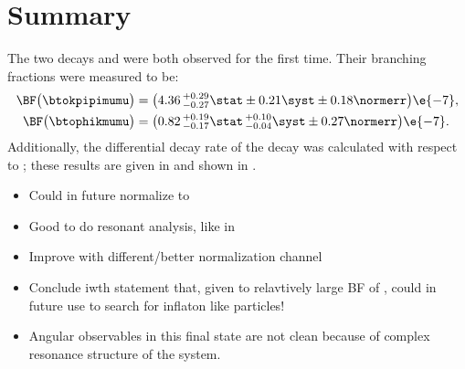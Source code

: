 \section{Summary}
\label{sec:hhh:conc}

The two \fcnc decays \btokpipimumu and \btophikmumu were both observed for the first time.
Their branching fractions were measured to be:
\begin{align*}
  \BF\big( \btokpipimumu \big)&=
  \big(4.36\,^{+0.29}_{-0.27}\stat\pm0.21\syst\pm0.18\normerr\big)\e{-7}, \\
  \BF\big(\btophikmumu\big)&=
  \big(0.82\,^{+0.19}_{-0.17}\stat\,^{+0.10}_{-0.04}\syst\pm0.27\normerr\big)\e{-7}.
\end{align*}
Additionally, the differential decay rate of the decay \btokpipimumu was calculated with respect to
\qsq; these results are given in  and shown in .

\begin{itemize}
  \item Could in future normalize to \decay{\Bp}{\jpsi\Kstar}
  \item Good to do resonant analysis, like in \decay{\Bp}{\kpipi\gamma}
  \item Improve with different/better normalization channel
  \item Conclude iwth statement that, given to relavtively large BF of \btokpipimumu, could in
    future use to search for inflaton like particles!
  \item Angular observables in this final state are not clean because of complex resonance
    structure of the \kpipi system.
\end{itemize}


